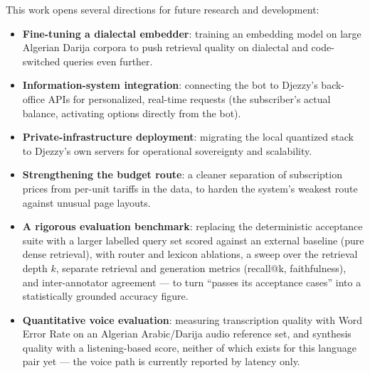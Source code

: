 \documentclass[12pt, a4paper]{report}
\newcommand{\humantext}[1]{#1}      %
\begin{document}
\humantext{This work opens several directions for future research and development:}
\begin{itemize}
    \item \humantext{\textbf{Fine-tuning a dialectal embedder}: training an embedding model on large Algerian Darija corpora to push retrieval quality on dialectal and code-switched queries even further.}
    \item \humantext{\textbf{Information-system integration}: connecting the bot to Djezzy's back-office APIs for personalized, real-time requests (the subscriber's actual balance, activating options directly from the bot).}
    \item \humantext{\textbf{Private-infrastructure deployment}: migrating the local quantized stack to Djezzy's own servers for operational sovereignty and scalability.}
    \item \humantext{\textbf{Strengthening the budget route}: a cleaner separation of subscription prices from per-unit tariffs in the data, to harden the system's weakest route against unusual page layouts.}
    \item \humantext{\textbf{A rigorous evaluation benchmark}: replacing the deterministic acceptance suite with a larger labelled query set scored against an external baseline (pure dense retrieval), with router and lexicon ablations, a sweep over the retrieval depth $k$, separate retrieval and generation metrics (recall@k, faithfulness), and inter-annotator agreement --- to turn ``passes its acceptance cases'' into a statistically grounded accuracy figure.}
    \item \humantext{\textbf{Quantitative voice evaluation}: measuring transcription quality with Word Error Rate on an Algerian Arabic/Darija audio reference set, and synthesis quality with a listening-based score, neither of which exists for this language pair yet --- the voice path is currently reported by latency only.}
\end{itemize}
\end{document}
